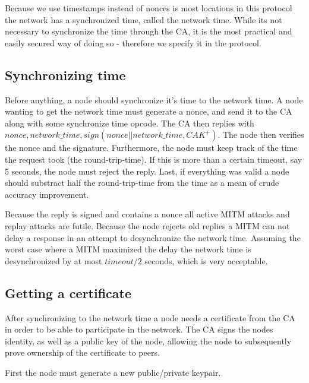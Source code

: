 \documentclass[12pt]{article}
\begin{document}
Because we use timestamps instead of nonces is most locations in this protocol
the network has a synchronized time, called the network time. While its not
necessary to synchronize the time through the CA, it is the most practical and
easily secured way of doing so - therefore we specify it in the protocol.


\subsection{Synchronizing time}

Before anything, a node should synchronize it's time to the network time. A
node wanting to get the network time must generate a nonce, and send it to the
CA along with some synchronize time opcode. The CA then replies with $nonce,
network\_time, sign(nonce || network\_time, CAK^+)$. The node then verifies the
nonce and the signature. Furthermore, the node must keep track of the time the
request took (the round-trip-time). If this is more than a certain timeout, say
5 seconds, the node must reject the reply. Last, if everything was valid a node
should substract half the round-trip-time from the time as a mean of crude
accuracy improvement.

Because the reply is signed and contains a nonce all active MITM attacks and
replay attacks are futile. Because the node rejects old replies a MITM can not
delay a response in an attempt to desynchronize the network time. Assuming the
worst case where a MITM maximized the delay the network time is desynchronized
by at most $timeout/2$ seconds, which is very acceptable.


\subsection{Getting a certificate}

After synchronizing to the network time a node needs a certificate from the CA
in order to be able to participate in the network. The CA signs the nodes
identity, as well as a public key of the node, allowing the node to
subsequently prove ownership of the certificate to peers.

First the node must generate a new public/private keypair.




\end{document}
